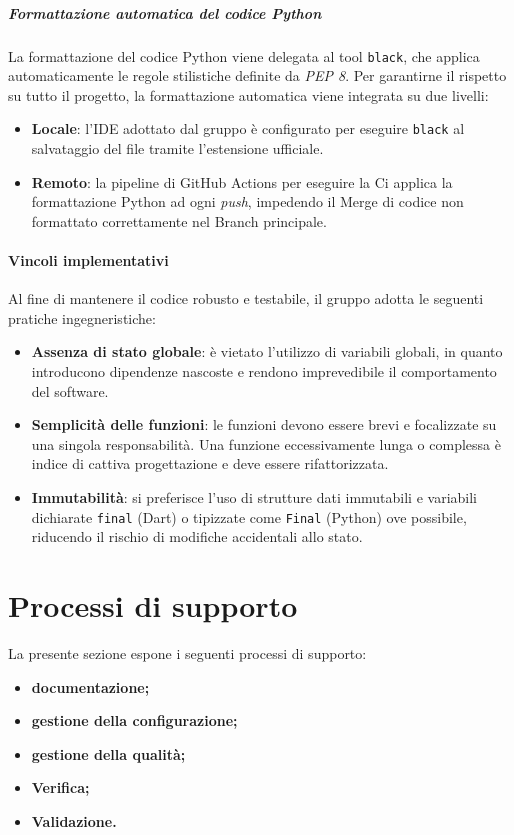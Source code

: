 \documentclass[a4paper,12pt]{article}
\begin{document}
\subparagraph{Formattazione automatica del codice Python}
La formattazione del codice Python viene delegata al tool \texttt{black}, che applica automaticamente le regole stilistiche definite da \textit{PEP 8}.
Per garantirne il rispetto su tutto il progetto, la formattazione automatica viene integrata su due livelli:
\begin{itemize}
    \item \textbf{Locale}: l'IDE adottato dal gruppo è configurato per eseguire \texttt{black} al salvataggio del file tramite l'estensione ufficiale.
    \item \textbf{Remoto}: la pipeline di GitHub Actions per eseguire la Ci applica la formattazione Python ad ogni \textit{push}, impedendo il Merge di codice non formattato correttamente nel Branch principale.
\end{itemize}

\paragraph{Vincoli implementativi}
Al fine di mantenere il codice robusto e testabile, il gruppo adotta le seguenti pratiche ingegneristiche:
\begin{itemize}
    \item \textbf{Assenza di stato globale}: è vietato l'utilizzo di variabili globali, in quanto introducono dipendenze nascoste e rendono imprevedibile il comportamento del software.
    \item \textbf{Semplicità delle funzioni}: le funzioni devono essere brevi e focalizzate su una singola responsabilità. Una funzione eccessivamente lunga o complessa è indice di cattiva progettazione e deve essere rifattorizzata.
    \item \textbf{Immutabilità}: si preferisce l'uso di strutture dati immutabili e variabili dichiarate \texttt{final} (Dart) o tipizzate come \texttt{Final} (Python) ove possibile, riducendo il rischio di modifiche accidentali allo stato.
\end{itemize}

\section{Processi di supporto}
La presente sezione espone i seguenti processi di supporto:
\begin{itemize}
    \item[(a)] \textbf{documentazione;}
    \item[(b)] \textbf{gestione della configurazione;}
    \item[(c)] \textbf{gestione della qualità;}
    \item[(d)] \textbf{Verifica;}
    \item[(e)] \textbf{Validazione.}
\end{itemize}
\end{document}
